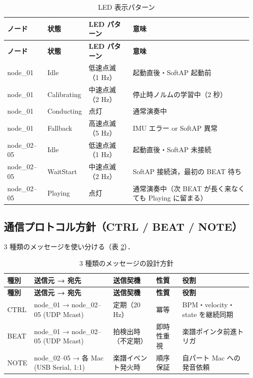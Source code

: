 \documentclass[lualatex,book,paper=a4paper,jafontsize=11.5pt,jafontscale=1.05]{jlreq}
\begin{document}
\begin{longtable}{p{} p{} p{} p{}}
\caption{LED 表示パターン}\label{tab:led-spec}\\
\toprule
\textbf{ノード} & \textbf{状態} & \textbf{LED パターン} & \textbf{意味} \\
\midrule
\endfirsthead
\toprule
\textbf{ノード} & \textbf{状態} & \textbf{LED パターン} & \textbf{意味} \\
\midrule
\endhead
node\_01     & Idle        & 低速点滅（1 Hz）   & 起動直後・SoftAP 起動前 \\
node\_01     & Calibrating & 中速点滅（2 Hz）   & 停止時ノルムの学習中（2 秒） \\
node\_01     & Conducting  & 点灯               & 通常演奏中 \\
node\_01     & Fallback    & 高速点滅（5 Hz）   & IMU エラー or SoftAP 異常 \\
node\_02--05 & Idle        & 低速点滅（1 Hz）   & 起動直後・SoftAP 未接続 \\
node\_02--05 & WaitStart   & 中速点滅（2 Hz）   & SoftAP 接続済，最初の BEAT 待ち \\
node\_02--05 & Playing     & 点灯               & 通常演奏中（次 BEAT が長く来なくても Playing に留まる） \\
\bottomrule
\end{longtable}

\subsection{通信プロトコル方針（CTRL / BEAT / NOTE）}\label{subsec:protocol-policy}

3 種類のメッセージを使い分ける（表 \ref{tab:msg-policy}）．

\begin{longtable}{l p{} p{} p{} p{}}
\caption{3 種類のメッセージの設計方針}\label{tab:msg-policy}\\
\toprule
\textbf{種別} & \textbf{送信元 → 宛先} & \textbf{送信契機} & \textbf{性質} & \textbf{役割} \\
\midrule
\endfirsthead
\toprule
\textbf{種別} & \textbf{送信元 → 宛先} & \textbf{送信契機} & \textbf{性質} & \textbf{役割} \\
\midrule
\endhead
CTRL & node\_01 → node\_02--05 (UDP Mcast)        & 定期（20 Hz）       & 冪等         & BPM・velocity・state を継続同期 \\
BEAT & node\_01 → node\_02--05 (UDP Mcast)        & 拍検出時（不定期） & 即時性重視   & 楽譜ポインタ前進トリガ \\
NOTE & node\_02--05 → 各 Mac (USB Serial, 1:1)    & 楽譜イベント発火時 & 順序保証     & 自パート Mac への発音依頼 \\
\bottomrule
\end{longtable}
\end{document}
